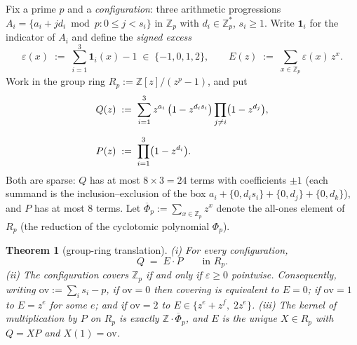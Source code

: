 \documentclass[11pt,a4paper]{article}
\numberwithin{equation}{section}
\theoremstyle{plain}
\theoremstyle{plain}
\newtheorem{theorem}{Theorem}[section]
\theoremstyle{definition}
\theoremstyle{remark}
\newcommand{\Z}{\mathbb{Z}}
\begin{document}
Fix a prime $p$ and a \emph{configuration}: three arithmetic progressions
$A_i=\{a_i+jd_i \bmod p:0\le j<s_i\}$ in $\Z_p$ with $d_i\in\Z_p^{*}$,
$s_i\ge 1$. Write $\mathbf 1_i$ for the indicator of $A_i$ and define the
\emph{signed excess}
\[
\varepsilon(x)\;:=\;\sum_{i=1}^{3}\mathbf 1_i(x)-1\;\in\;\{-1,0,1,2\},
\qquad
E(z)\;:=\;\sum_{x\in\Z_p}\varepsilon(x)\,z^x .
\]
Work in the group ring $R_p:=\Z[z]/(z^p-1)$, and put
\begin{align*}
Q(z)\;&:=\;\sum_{i=1}^{3} z^{a_i}\,\bigl(1-z^{d_i s_i}\bigr)
        \prod_{j\ne i}\bigl(1-z^{d_j}\bigr),\\[\medskipamount]
P(z)\;&:=\;\prod_{i=1}^{3}\bigl(1-z^{d_i}\bigr).
\end{align*}
Both are sparse: $Q$ has at most $8\times 3=24$ terms with coefficients
$\pm1$ (each summand is the inclusion--exclusion of the box
$a_i+\{0,d_is_i\}+\{0,d_j\}+\{0,d_k\}$), and $P$ has at most $8$ terms. Let
$\overline\Phi_p:=\sum_{x\in\Z_p}z^x$ denote the all-ones element of $R_p$
(the reduction of the cyclotomic polynomial $\Phi_p$).

\begin{theorem}[group-ring translation]\label{thm:GT}
\;\textup{(i)} For \emph{every} configuration,
\[
Q \;=\; E\cdot P \qquad\text{in } R_p .
\]
\textup{(ii)} The configuration covers $\Z_p$ if and only if
$\varepsilon\ge 0$ pointwise. Consequently, writing
$\mathrm{ov}:=\sum_i s_i-p$, if $\mathrm{ov}=0$ then covering is equivalent
to $E=0$; if $\mathrm{ov}=1$ to $E=z^e$ for some $e$; and if
$\mathrm{ov}=2$ to $E\in\{z^e+z^f,\;2z^e\}$.
\textup{(iii)} The kernel of multiplication by $P$ on $R_p$ is exactly
$\Z\cdot\overline\Phi_p$, and $E$ is the \emph{unique} $X\in R_p$ with
$Q=XP$ and $X(1)=\mathrm{ov}$.
\end{theorem}
\end{document}
